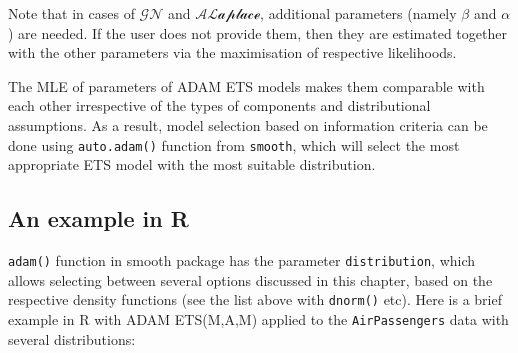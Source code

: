 \documentclass[
]{book}
\theoremstyle{definition}
\theoremstyle{definition}
\theoremstyle{definition}
\theoremstyle{definition}
\theoremstyle{remark}
\begin{document}
Note that in cases of \(\mathcal{GN}\) and \(\mathcal{ALaplace}\), additional parameters (namely \(\beta\) and \(\alpha\)) are needed. If the user does not provide them, then they are estimated together with the other parameters via the maximisation of respective likelihoods.

The MLE of parameters of ADAM ETS models makes them comparable with each other irrespective of the types of components and distributional assumptions. As a result, model selection based on information criteria can be done using \texttt{auto.adam()} function from \texttt{smooth}, which will select the most appropriate ETS model with the most suitable distribution.

\hypertarget{an-example-in-r}{%
\subsection{An example in R}\label{an-example-in-r}}

\texttt{adam()} function in smooth package has the parameter \texttt{distribution}, which allows selecting between several options discussed in this chapter, based on the respective density functions (see the list above with \texttt{dnorm()} etc). Here is a brief example in R with ADAM ETS(M,A,M) applied to the \texttt{AirPassengers} data with several distributions:
\end{document}
